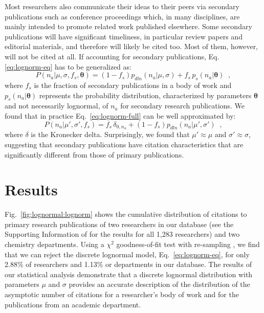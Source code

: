 Most researchers also communicate their ideas to their peers via secondary publications such as conference proceedings which, in many disciplines, are mainly intended to promote related work published elsewhere. Some secondary publications will have significant timeliness, in particular review papers and editorial materials, and therefore will likely be cited too. Most of them, however, will not be cited at all. If accounting for secondary publications, Eq.~ \eqref{eq:lognorm-eq} has to be generalized as:
\begin{equation}\label{eq:lognorm-full}
P(n_a|\mu,\sigma,f_s, \boldsymbol{\theta}) = (1-f_s) p_{dln}(n_a|\mu,\sigma) + f_s \, p_s(n_a|\boldsymbol{\theta})\;\;,
\end{equation}
where $f_s$ is the fraction of secondary publications in a body of work and $p_s(n_a| \boldsymbol{\theta})$ represents the probability distribution, characterized by parameters $\boldsymbol{\theta}$ and not necessarily lognormal, of $n_a$ for secondary research publications. We found that in practice Eq.~\eqref{eq:lognorm-full} can be well approximated by:
\begin{equation*}
P(n_a|\mu',\sigma',f_s) = f_s \, \delta_{0,n_a} + (1-f_s) p_{dln}(n_a|\mu',\sigma')\;\;,
\end{equation*}
where $\delta$ is the Kronecker delta. Surprisingly, we found that $\mu' \approx \mu$ and $\sigma' \approx \sigma$, suggesting that secondary publications have citation characteristics that are significantly different from those of primary publications.


\section{Results}

Fig.~\ref{fig:lognormal:lognorm} shows the cumulative distribution of citations to primary research publications of two researchers in our database (see the Supporting Information of \cite{Moreira2015} for the results for all 1,283 researchers) and two chemistry departments. Using a $\chi^2$ goodness-of-fit test with re-sampling \cite{Manly2006}, we find that we can reject the discrete lognormal model, Eq.~\eqref{eq:lognorm-eq}, for only 2.88\% of researchers and 1.13\% or departments in our database. The results of our statistical analysis demonstrate that a discrete lognormal distribution with parameters $\mu$ and $\sigma$ provides an accurate description of the distribution of the asymptotic number of citations for a researcher's body of work and for the publications from an academic department.

